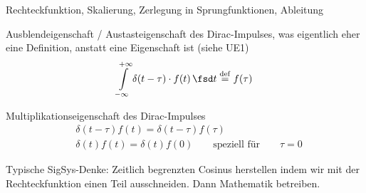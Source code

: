 \begin{Werkzeug}
Rechteckfunktion, Skalierung, Zerlegung in Sprungfunktionen, Ableitung

Ausblendeigenschaft / Austasteigenschaft des Dirac-Impulses,
was eigentlich eher eine Definition, anstatt eine Eigenschaft ist (siehe UE1)
\begin{equation}
\int\limits_{-\infty}^{+\infty} \delta(t-\tau) \cdot f(t) \, \fsd t \stackrel{\mathrm{def}}= f(\tau)
\end{equation}

Multiplikationseigenschaft des Dirac-Impulses
\begin{align}
&\delta(t-\tau) f(t) = \delta(t-\tau) f(\tau)\\
&\delta(t) f(t) = \delta(t) f(0) \qquad \text{speziell für} \qquad \tau=0
\end{align}

\end{Werkzeug}
\begin{Ansatz}
Typische SigSys-Denke: Zeitlich begrenzten Cosinus herstellen indem wir mit der
Rechteckfunktion einen Teil ausschneiden. Dann Mathematik betreiben.
\end{Ansatz}
